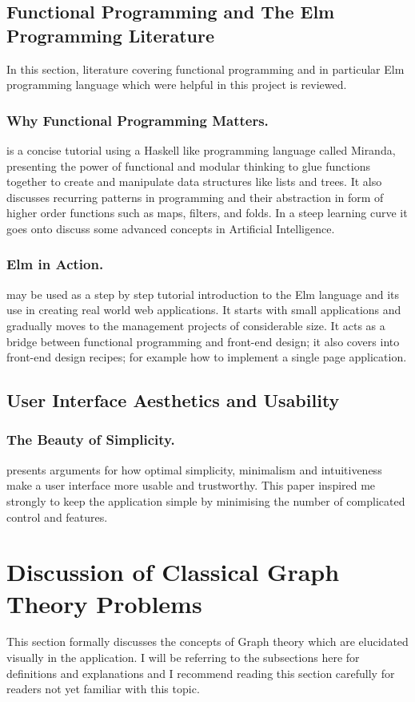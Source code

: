 \subsection{Functional Programming and The Elm Programming Literature}
In this section, literature covering functional programming and in particular
Elm programming language which were helpful in this project is reviewed.

\subsubsection{Why Functional Programming Matters.}
\cite{Hughes89} is a concise tutorial using a Haskell like programming language called
Miranda, presenting the power of functional and modular thinking to glue
functions together to create and manipulate data structures like lists and
trees. It also discusses recurring patterns in programming and their
abstraction in form of higher order functions such as maps, filters, and folds. In a steep learning curve it goes onto discuss some advanced concepts
in Artificial Intelligence.

\subsubsection{Elm in Action.}
\cite{feldman2020elm} may be used as a step by step tutorial introduction to the Elm
language and its use in creating real world web applications. It starts with
small applications and gradually moves to the management projects of
considerable size. It acts as a bridge between functional programming and
front-end design; it also covers into front-end design recipes; for example how
to implement a single page application.

\subsection{User Interface Aesthetics and Usability}
\subsubsection{The Beauty of Simplicity.}
\cite{Karvonen2000} presents arguments for how optimal simplicity, minimalism and
intuitiveness make a user interface more usable and trustworthy. This paper inspired me strongly to keep the application simple by minimising the number of complicated
control and features.

\section{Discussion of Classical Graph Theory Problems}
This section formally discusses the concepts of Graph theory which are
elucidated visually in the application.  I will be referring to the subsections here for definitions and explanations and I recommend reading this section carefully for readers not yet familiar with this topic.

